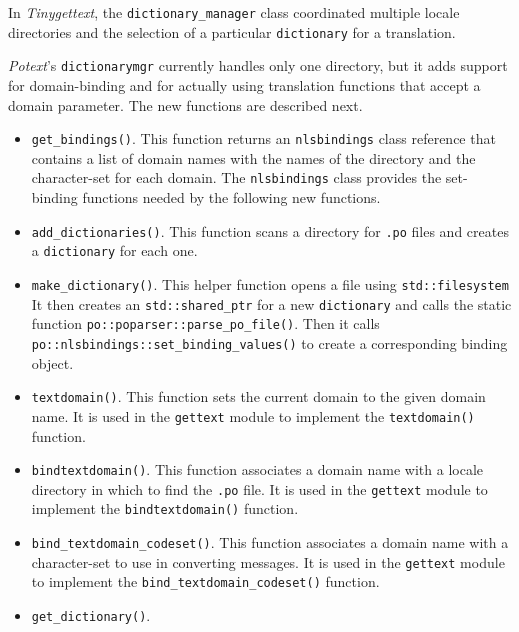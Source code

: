   In \textsl{Tinygettext}, the \texttt{dictionary\_manager} class 
   coordinated multiple locale directories and the selection of
   a particular \texttt{dictionary} for a translation.

   \textsl{Potext}'s \texttt{dictionarymgr}
   currently handles only one directory, but it
   adds support for domain-binding and for actually using translation
   functions that accept a domain parameter.
   The new functions are described next.

   \begin{itemize}
      \item \texttt{get\_bindings()}. This function returns an
         \texttt{nlsbindings} class reference that contains a list of domain
         names with the names of the directory and the character-set
         for each domain.
         The \texttt{nlsbindings} class provides the set-binding functions
         needed by the following new functions.
      \item \texttt{add\_dictionaries()}.
         This function scans a directory for \texttt{.po} files
         and creates a \texttt{dictionary} for each one.
      \item \texttt{make\_dictionary()}.
         This helper function opens a file using \texttt{std::filesystem}
         It then creates an \texttt{std::shared\_ptr} for a new
         \texttt{dictionary} and calls the static function
         \texttt{po::poparser::parse\_po\_file()}.
         Then it calls \texttt{po::nlsbindings::set\_binding\_values()}
         to create a corresponding binding object.
      \item \texttt{textdomain()}.
         This function sets the current domain to the given domain name.
         It is used in the \texttt{gettext} module to
         implement the \texttt{textdomain()} function.
      \item \texttt{bindtextdomain()}.
         This function associates a domain name with a locale directory
         in which to find the \texttt{.po} file.
         It is used in the \texttt{gettext} module to
         implement the \texttt{bindtextdomain()} function.
      \item \texttt{bind\_textdomain\_codeset()}.
         This function associates a domain name with a character-set to
         use in converting messages.
         It is used in the \texttt{gettext} module to
         implement the \texttt{bind\_textdomain\_codeset()} function.
      \item \texttt{get\_dictionary()}.
   \end{itemize}

